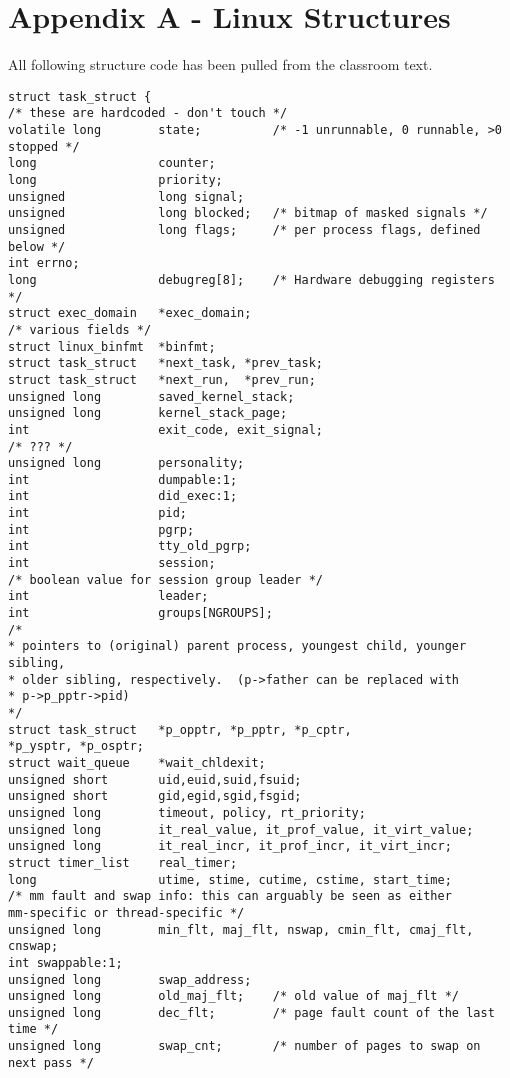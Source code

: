 \documentclass[10pt,letterpaper,onecolumn,draftclsnofoot]{IEEEtran}
\begin{document}
\section{Appendix A - Linux Structures}
All following structure code has been pulled from the classroom text. 
\cite{robertlove2010}
\begin{lstlisting}[caption=The Linux task\_struct is responsible for keeping track of the state of each process.]
struct task_struct {
/* these are hardcoded - don't touch */
volatile long        state;          /* -1 unrunnable, 0 runnable, >0 stopped */
long                 counter;
long                 priority;
unsigned             long signal;
unsigned             long blocked;   /* bitmap of masked signals */
unsigned             long flags;     /* per process flags, defined below */
int errno;
long                 debugreg[8];    /* Hardware debugging registers */
struct exec_domain   *exec_domain;
/* various fields */
struct linux_binfmt  *binfmt;
struct task_struct   *next_task, *prev_task;
struct task_struct   *next_run,  *prev_run;
unsigned long        saved_kernel_stack;
unsigned long        kernel_stack_page;
int                  exit_code, exit_signal;
/* ??? */
unsigned long        personality;
int                  dumpable:1;
int                  did_exec:1;
int                  pid;
int                  pgrp;
int                  tty_old_pgrp;
int                  session;
/* boolean value for session group leader */
int                  leader;
int                  groups[NGROUPS];
/*
* pointers to (original) parent process, youngest child, younger sibling,
* older sibling, respectively.  (p->father can be replaced with
* p->p_pptr->pid)
*/
struct task_struct   *p_opptr, *p_pptr, *p_cptr,
*p_ysptr, *p_osptr;
struct wait_queue    *wait_chldexit;
unsigned short       uid,euid,suid,fsuid;
unsigned short       gid,egid,sgid,fsgid;
unsigned long        timeout, policy, rt_priority;
unsigned long        it_real_value, it_prof_value, it_virt_value;
unsigned long        it_real_incr, it_prof_incr, it_virt_incr;
struct timer_list    real_timer;
long                 utime, stime, cutime, cstime, start_time;
/* mm fault and swap info: this can arguably be seen as either
mm-specific or thread-specific */
unsigned long        min_flt, maj_flt, nswap, cmin_flt, cmaj_flt, cnswap;
int swappable:1;
unsigned long        swap_address;
unsigned long        old_maj_flt;    /* old value of maj_flt */
unsigned long        dec_flt;        /* page fault count of the last time */
unsigned long        swap_cnt;       /* number of pages to swap on next pass */

\end{lstlisting}
\end{document}
